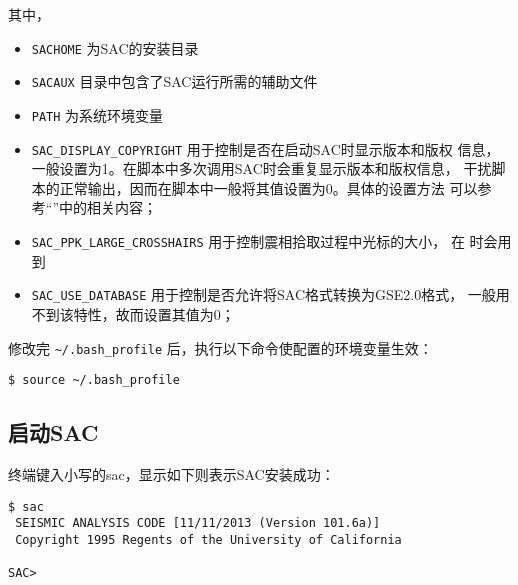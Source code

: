 其中，
\begin{itemize}
\item \texttt{SACHOME} 为SAC的安装目录
\item \texttt{SACAUX} 目录中包含了SAC运行所需的辅助文件
\item \texttt{PATH} 为系统环境变量
\item \verb|SAC_DISPLAY_COPYRIGHT| 用于控制是否在启动SAC时显示版本和版权
    信息，一般设置为1。在脚本中多次调用SAC时会重复显示版本和版权信息，
    干扰脚本的正常输出，因而在脚本中一般将其值设置为0。具体的设置方法
    可以参考``''中的相关内容；
\item \verb|SAC_PPK_LARGE_CROSSHAIRS| 用于控制震相拾取过程中光标的大小，
    在  时会用到
\item \verb|SAC_USE_DATABASE| 用于控制是否允许将SAC格式转换为GSE2.0格式，
    一般用不到该特性，故而设置其值为0；
\end{itemize}

修改完 \verb|~/.bash_profile| 后，执行以下命令使配置的环境变量生效：
\begin{verbatim}
$ source ~/.bash_profile
\end{verbatim}

\subsection{启动SAC}
终端键入小写的sac，显示如下则表示SAC安装成功：
\begin{verbatim}
$ sac
 SEISMIC ANALYSIS CODE [11/11/2013 (Version 101.6a)]
 Copyright 1995 Regents of the University of California

SAC>
\end{verbatim}
